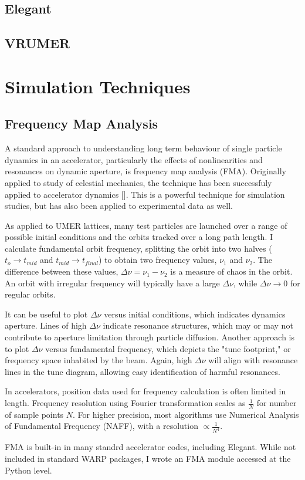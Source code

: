 \subsection{Elegant}
\subsection{VRUMER}

\section{Simulation Techniques}
\subsection{Frequency Map Analysis}

A standard approach to understanding long term behaviour of single particle dynamics in an accelerator, particularly the effects of nonlinearities and resonances on dynamic aperture, is frequency map analysis (FMA). Originally applied to study of celestial mechanics, the technique has been successfuly applied to accelerator dynamics [\cite{Laskar2003}]. This is a powerful technique for simulation studies, but has also been applied to experimental data as well. 

As applied to UMER lattices, many test particles are launched over a range of possible initial conditions and the orbits tracked over a long path length. I calculate fundamental orbit frequency, splitting the orbit into two halves ($t_o \to t_{mid}$ and $t_{mid} \to t_{final}$) to obtain two frequency values, $\nu_1$ and $\nu_2$. The difference between these values, $\Delta \nu = \nu_1-\nu_2$ is a measure of chaos in the orbit. An orbit with irregular frequency will typically have a large $\Delta \nu$, while $\Delta \nu \to 0$ for regular orbits. 

It can be useful to plot $\Delta \nu $ versus initial conditions, which indicates dynamics aperture. Lines of high $\Delta \nu$ indicate resonance structures, which may or may not contribute to aperture limitation through particle diffusion. Another approach is to plot $\Delta \nu $ versus fundamental frequency, which depicts the "tune footprint," or frequency space inhabited by the beam. Again, high $\Delta \nu$ will align with resonance lines in the tune diagram, allowing easy identification of harmful resonances. 

In accelerators, position data used for frequency calculation is often limited in length. Frequency resolution using Fourier transformation scales as $\frac{1}{N}$ for number of sample points $N$. For higher precision, most algorithms use Numerical Analysis of Fundamental Frequency (NAFF), with a resolution $\propto \frac{1}{N^4}$. 




FMA is built-in in many standrd accelerator codes, including Elegant. While not included in standard WARP packages, I wrote an FMA module accessed at the Python level. 